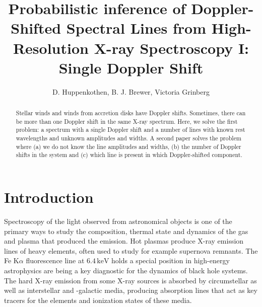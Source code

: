 \documentclass[12pt]{emulateapj}
\begin{document}
\title{Probabilistic inference of Doppler-Shifted Spectral Lines from High-Resolution X-ray Spectroscopy I: Single Doppler Shift}

\author{D. Huppenkothen, B. J. Brewer, Victoria Grinberg}
 



\begin{abstract}
Stellar winds and winds from accretion disks have Doppler shifts. Sometimes, there can be more than one Doppler shift in 
the same X-ray spectrum. Here, we solve the first problem: a spectrum with a single Doppler shift and a number of lines with 
known rest wavelengths and unknown amplitudes and widths. A second paper solves the problem where (a) we do not know the line amplitudes and widths, (b) the 
number of Doppler shifts in the system and (c) which line is present in which Doppler-shifted component.
\end{abstract}


\section{Introduction}


Spectroscopy of the light observed from astronomical objects is one of the primary ways to study the composition, thermal state and dynamics of the gas and plasma that produced the emission. Hot plasmas produce X-ray emission lines of heavy elements, often used to study for example supernova remnants. The Fe K$\alpha$ fluorescence line at $6.4 \, \mathrm{keV}$ holds a special position in high-energy astrophysics are being a key diagnostic for the dynamics of black hole systems. The hard X-ray emission from some X-ray sources is absorbed by circumstellar as well as interstellar and -galactic media, producing absorption lines that act as key tracers for the elements and ionization states of these media. 
\end{document}
